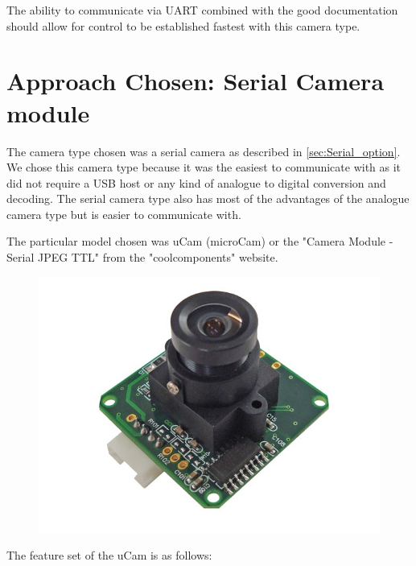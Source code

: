 The ability to communicate via UART combined with the good documentation should allow for control to be established fastest with this camera type.

\section{Approach Chosen: Serial Camera module}
\label{sec:John_chosen_options}

The camera type chosen was a serial camera as described in \ref{sec:Serial_option}. We chose this camera type because it was the easiest to communicate with as it did not require a USB host or any kind of analogue to digital conversion and decoding. The serial camera type also has most of the advantages of the analogue camera type but is easier to communicate with.

The particular model chosen was uCam (microCam) or the "Camera Module - Serial JPEG TTL" from the "coolcomponents" website.

\begin{figure}[H]
        \centering
        \includegraphics[width=1.00\textwidth]{figures/uCam.jpg}
        \label{fig:uCam_photo}
\end{figure}

The feature set of the uCam is as follows:

